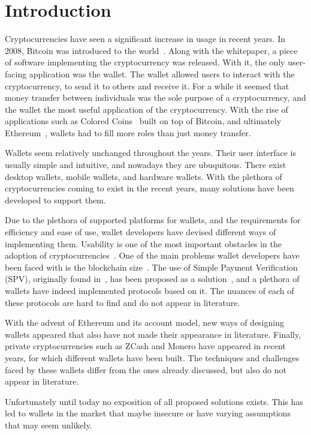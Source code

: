 \section{Introduction}
Cryptocurrencies have seen a significant increase in usage in recent years. In 2008, Bitcoin was introduced to the world~\cite{bitcoin}. 
Along with the whitepaper, a piece of software implementing the cryptocurrency was released. With it, the only user-facing application was the wallet. The wallet allowed users to interact with the cryptocurrency, to send it to others and receive it. For a while it seemed that money transfer between individuals was the sole purpose of a cryptocurrency, and the wallet the most useful application of the cryptocurrency. With the rise of applications such as Colored Coins~\cite{coloredcoins} built on top of Bitcoin, and ultimately Ethereum~\cite{buterin,wood2014ethereum}, wallets had to fill more roles than just money transfer.

Wallets seem relatively unchanged throughout the years. Their user interface is usually simple and intuitive, and nowadays they are ubuquitous. There exist desktop wallets, mobile wallets, and hardware wallets. With the plethora of cryptocurrencies coming to exist in the recent years, many solutions have been developed to support them.

Due to the plethora of supported platforms for wallets, and the requirements for efficiency and ease of use, wallet developers have devised different ways of implementing them.
Usability is one of the most important obstacles in the adoption of cryptocurrencies~\cite{meiklejohn2018top}.
One of the main problems wallet developers have been faced with is the blockchain size~\cite{meiklejohn2018top,sok}. The use of Simple Payment Verification (SPV), originally found in~\cite{bitcoin}, has been proposed as a solution~\cite{bip37}, and a plethora of wallets have indeed implemented protocols based on it. The nuances of each of these protocols are hard to find and do not appear in literature.

With the advent of Ethereum and its account model, new ways of designing wallets appeared that also have not made their appearance in literature. Finally, private cryptocurrencies such as ZCash and Monero have appeared in recent years, for which different wallets have been built. The techniques and challenges faced by these wallets differ from the ones already discussed, but also do not appear in literature.

Unfortunately until today no exposition of all proposed solutions exists. This has led to wallets in the market that maybe insecure or have varying assumptions that may seem unlikely.

